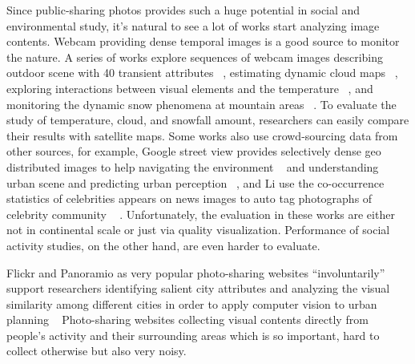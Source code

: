 Since public-sharing photos provides such a huge potential in social and environmental study, it's 
natural to see a lot of works start analyzing image contents. Webcam providing dense temporal images 
is a good source to monitor the nature. A series of works explore sequences 
of webcam images 
describing outdoor scene with 40 transient attributes ~\cite{transattri}, estimating dynamic cloud maps ~\cite{building dynamic cloud maps from groud up, webcam2satellite}, exploring interactions between visual elements and the temperature  ~\cite{hot or not}, and monitoring the dynamic snow phenomena at mountain areas ~\cite{SnowWatch: Snow Monitoring through Acquisition and Analysis of User-Generated Content, Snow phenomena modeling through online public media}. 
To evaluate the study of temperature, cloud, and snowfall amount,
 researchers can easily compare their results with satellite maps. 
Some works also use crowd-sourcing data from other sources, for example, Google street view provides selectively dense geo distributed images to help navigating the environment ~\cite{looking beyond the visible scene} and understanding urban scene and predicting urban perception ~\cite{predicting and understanding urban perception with cnn}, and Li \etal use the co-occurrence statistics of celebrities appears on news images to auto tag photographs of celebrity community ~\cite{celebritynet: a social network constructed from large scale online celebrity images}
. 
Unfortunately, 
the evaluation in these works are either not in continental scale or just via quality visualization.
Performance of social activity studies, on the other hand, are even harder to evaluate.

Flickr and Panoramio as very popular photo-sharing websites 
``involuntarily'' support researchers identifying salient city attributes and analyzing the visual similarity among different cities in order to apply computer vision to urban planning ~\cite{Recognizing city identity via attribute analysis of geo-tagged images}
Photo-sharing websites collecting visual contents directly from people's activity and their surrounding areas which is so important, hard to collect otherwise but also very noisy. 

